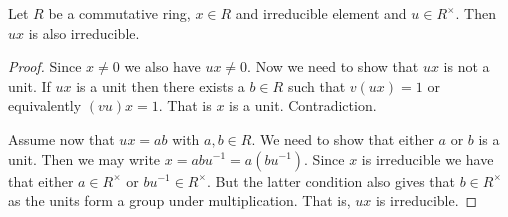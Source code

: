 \documentclass[10pt, a4paper]{article}
\begin{document}
\begin{lemma}
    Let $R$ be a commutative ring,
    $x \in R$ and irreducible element and $u \in R ^ {\times}$.
    Then $ux$ is also irreducible.

    \begin{proof}
        Since $x \neq 0$ we also have $ux \neq 0$.
        Now we need to show that $ux$ is not a unit.
        If $ux$ is a unit then there exists a $b \in R$ such that $v(ux) = 1$ or equivalently $(vu)x = 1$.
        That is $x$ is a unit.
        Contradiction.

        Assume now that $ux = ab$ with $a, b \in R$.
        We need to show that either $a$ or $b$ is a unit.
        Then we may write $x = abu ^ {-1} = a(bu ^ {-1})$.
        Since $x$ is irreducible we have that either $a \in R ^ {\times}$ or $bu ^ {-1} \in R ^ {\times}$.
        But the latter condition also gives that $b \in R ^ {\times}$ as the units form a group under multiplication.
        That is,
        $ux$ is irreducible.
    \end{proof}
\end{lemma}
\end{document}
